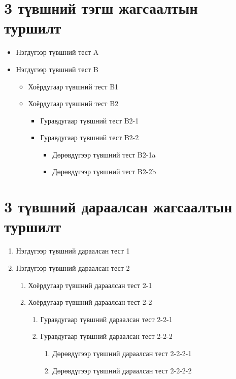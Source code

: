 \documentclass[mn]{../../elegantbook}
\begin{document}
\section{3 түвшний тэгш жагсаалтын туршилт}
\begin{itemize}
\item Нэгдүгээр түвшний тест A
\item Нэгдүгээр түвшний тест B
    \begin{itemize}
    \item Хоёрдугаар түвшний тест B1
    \item Хоёрдугаар түвшний тест B2
        \begin{itemize}
        \item Гуравдугаар түвшний тест B2-1
        \item Гуравдугаар түвшний тест B2-2
            \begin{itemize}
            \item Дөрөвдүгээр түвшний тест B2-1a
            \item Дөрөвдүгээр түвшний тест B2-2b
            \end{itemize}
        \end{itemize}
    \end{itemize}
\end{itemize}

\section{3 түвшний дараалсан жагсаалтын туршилт}
\begin{enumerate}
\item Нэгдүгээр түвшний дараалсан тест 1
\item Нэгдүгээр түвшний дараалсан тест 2
    \begin{enumerate}
    \item Хоёрдугаар түвшний дараалсан тест 2-1
    \item Хоёрдугаар түвшний дараалсан тест 2-2
        \begin{enumerate}
        \item Гуравдугаар түвшний дараалсан тест 2-2-1
        \item Гуравдугаар түвшний дараалсан тест 2-2-2
            \begin{enumerate}
            \item Дөрөвдүгээр түвшний дараалсан тест 2-2-2-1
            \item Дөрөвдүгээр түвшний дараалсан тест 2-2-2-2
            \end{enumerate}
        \end{enumerate}
    \end{enumerate}
\end{enumerate}
\end{document}
